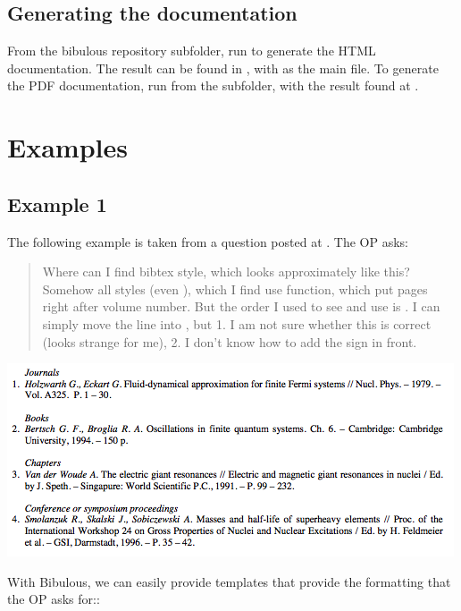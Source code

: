 \documentclass[letterpaper,10pt,english]{sphinxmanual}
\begin{document}
\section{Generating the documentation}
\label{developer_guide:generating-the-documentation}
From the bibulous repository  subfolder, run  to generate the HTML documentation. The result can be found in , with  as the main file. To generate the PDF documentation, run  from the  subfolder, with the result found at .


\chapter{Examples}
\label{examples::doc}\label{examples:examples}

\section{Example 1}
\label{examples:example-1}
The following example is taken from a question posted at . The OP asks:
\begin{quote}

Where can I find bibtex style, which looks approximately like this? Somehow all styles (even ), which I find use  function, which put pages right after volume number. But the order I used to see and use is . I can simply move the line  into , but 1. I am not sure whether this is correct (looks strange for me), 2. I don't know how to add the \code{-{-}-} sign in front.
\end{quote}

\includegraphics[width=0.500\linewidth]{example1a.png}

With Bibulous, we can easily provide templates that provide the formatting that the OP asks for::
\end{document}
